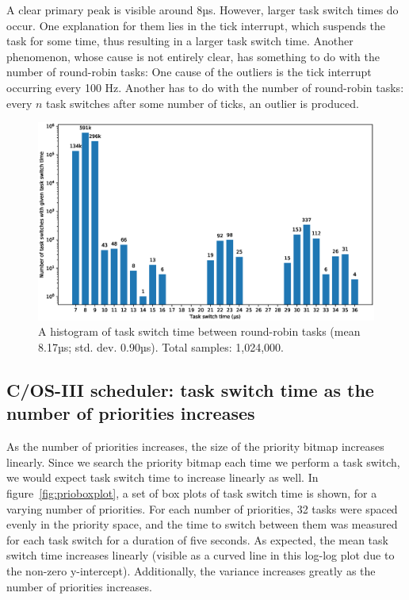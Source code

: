 \documentclass[twoside]{uva-inf-bachelor-thesis}
\newcommand{\ucosiii}{\textmu C/OS-III\xspace}
\begin{document}
A clear primary peak is visible around 8µs. However, larger task switch times do occur. One explanation for them lies in the tick interrupt, which suspends the task for some time, thus resulting in a larger task switch time. Another phenomenon, whose cause is not entirely clear, has something to do with the number of round-robin tasks:  One cause of the outliers is the tick interrupt occurring every 100 Hz. Another has to do with the number of round-robin tasks: every $n$ task switches after some number of ticks, an outlier is produced.

\begin{figure}[htpb]
    \centering
    \includegraphics[width=\textwidth]{task_switch_time.eps}
    \caption{A histogram of task switch time between round-robin tasks (mean 8.17µs; std. dev. 0.90µs). Total samples: 1,024,000.}
    \label{fig:rrhist}
\end{figure}

\subsection{\ucosiii scheduler: task switch time as the number of priorities increases}
As the number of priorities increases, the size of the priority bitmap increases linearly. Since we search the priority bitmap each time we perform a task switch, we would expect task switch time to increase linearly as well. In figure~\ref{fig:prioboxplot}, a set of box plots of task switch time is shown, for a varying number of priorities. For each number of priorities, 32 tasks were spaced evenly in the priority space, and the time to switch between them was measured for each task switch for a duration of five seconds. As expected, the mean task switch time increases linearly (visible as a curved line in this log-log plot due to the non-zero y-intercept). Additionally, the variance increases greatly as the number of priorities increases.
\end{document}
